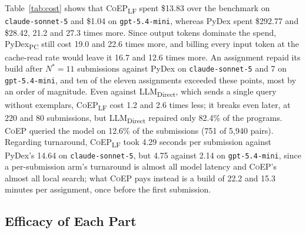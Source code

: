 \documentclass[acmsmall,screen,review,anonymous,nonacm]{acmart}
\newcommand{\tool}{\textsc{CoEP}\xspace}
\newcommand{\coepLF}{\textsc{CoEP}\textsubscript{LF}\xspace}
\newcommand{\pydexPC}{PyDex\textsubscript{PC}\xspace}
\newcommand{\direct}{LLM\textsubscript{Direct}\xspace}
\newcommand{\cs}{\texttt{claude-sonnet-5}\xspace}
\newcommand{\gm}{\texttt{gpt-5.4-mini}\xspace}
\begin{document}
Table~\ref{tab:cost} shows that \coepLF spent \$13.83 over the benchmark on \cs and \$1.04 on \gm, whereas PyDex spent \$292.77 and \$28.42, 21.2 and 27.3 times more. Since output tokens dominate the spend, \pydexPC still cost 19.0 and 22.6 times more, and billing every input token at the cache-read rate would leave it 16.7 and 12.6 times more. An assignment repaid its build after $N^{*} = 11$ submissions against PyDex on \cs and 7 on \gm, and ten of the eleven assignments exceeded these points, most by an order of magnitude. Even against \direct, which sends a single query without exemplars, \coepLF cost 1.2 and 2.6 times less; it breaks even later, at 220 and 80 submissions, but \direct repaired only 82.4\% of the programs. \tool queried the model on 12.6\% of the submissions (751 of 5{,}940 pairs). Regarding turnaround, \coepLF took 4.29 seconds per submission against PyDex's 14.64 on \cs, but 4.75 against 2.14 on \gm, since a per-submission arm's turnaround is almost all model latency and \tool's almost all local search; what \tool pays instead is a build of 22.2 and 15.3 minutes per assignment, once before the first submission.

\subsection{Efficacy of Each Part}
\label{sec:rq-stage}
\end{document}
